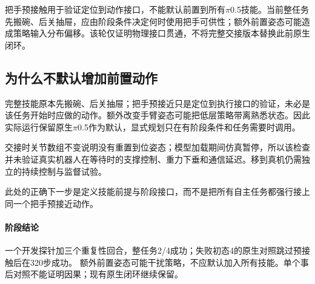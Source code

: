 把手预接触用于验证定位到动作接口，不能默认前置到所有\(\pi\)0.5技能。当前整任务先搬碗、后关抽屉，应由阶段条件决定何时使用把手可供性；额外前置姿态可能造成策略输入分布偏移。该轮仅证明物理接口贯通，不将完整交接版本替换此前原生闭环。


\subsection{为什么不默认增加前置动作}\label{s20-detail-3}

完整技能原本先搬碗、后关抽屉；把手预接近只是定位到执行接口的验证，未必是该任务开始时应做的动作。额外改变手臂姿态可能把低层策略带离熟悉状态。因此实际运行保留原生\(\pi\)0.5作为默认，显式规划只在有阶段条件和任务需要时调用。

交接时关节数组不变说明没有重置到位姿态；模型加载期间仿真暂停，所以该检查并未验证真实机器人在等待时的支撑控制、重力下垂和通信延迟。移到真机仍需独立的持续控制与监督试验。

此处的正确下一步是定义技能前提与阶段接口，而不是把所有自主任务都强行接上同一个把手预接近动作。


\paragraph{阶段结论}一个开发探针加三个重复性回合，整任务2/4成功；失败初态4的原生对照跳过预接触后在320步成功。 额外前置姿态可能干扰策略，不应默认加入所有技能。单个事后对照不能证明因果；现有原生闭环继续保留。



\FloatBarrier
